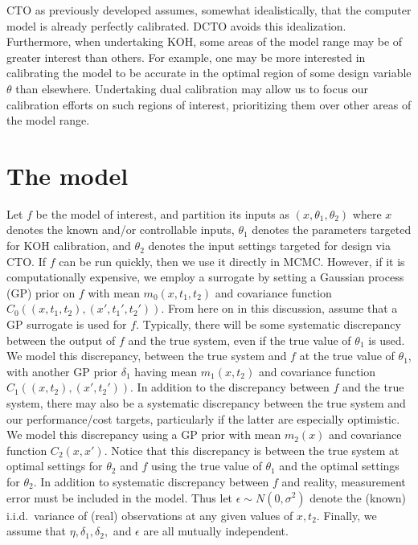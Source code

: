 \documentclass[12pt]{article}
\begin{document}
CTO as previously developed assumes, somewhat idealistically, that the computer model is already perfectly calibrated.
%
DCTO avoids this idealization.
%
Furthermore, when undertaking KOH, some areas of the model range may be of greater interest than others.
%
For example, one may be more interested in calibrating the model to be accurate in the optimal region of some design variable $\theta$ than elsewhere.
%
Undertaking dual calibration may allow us to focus our calibration efforts on such regions of interest, prioritizing them over other areas of the model range.
%

\section{The model}

%
Let $f$ be the model of interest, and partition its inputs as $(x,\theta_1,\theta_2)$ where $x$ denotes the known and/or controllable inputs, $\theta_1$ denotes the parameters targeted for KOH calibration, and $\theta_2$ denotes the input settings targeted for design via CTO.
%
If $f$ can be run quickly, then we use it directly in MCMC.
%
However, if it is computationally expensive, we employ a surrogate by setting a Gaussian process (GP) prior on $f$ with mean $m_0(x,t_1,t_2)$ and covariance function $C_0((x,t_1,t_2),(x',t_1',t_2'))$.
%
From here on in this discussion, assume that a GP surrogate is used for $f$.
%
Typically, there will be some systematic discrepancy between the output of $f$ and the true system, even if the true value of $\theta_1$ is used.
%
We model this discrepancy, between the true system and $f$ at the true value of $\theta_1$, with another GP prior $\delta_1$ having mean $m_1(x,t_2)$ and covariance function $C_1((x,t_2),(x',t_2'))$.
%
In addition to the discrepancy between $f$ and the true system, there may also be a systematic discrepancy between the true system and our performance/cost targets, particularly if the latter are especially optimistic.
%
We model this discrepancy using a GP prior with mean $m_2(x)$ and covariance function $C_2(x,x')$.
%
Notice that this discrepancy is between the true system at optimal settings for $\theta_2$ and $f$ using the true value of $\theta_1$ and the optimal settings for $\theta_2$.
%
In addition to systematic discrepancy between $f$ and reality, measurement error must be included in the model.
%
Thus let $\epsilon\sim N(0,\sigma^2)$ denote the (known) i.i.d.\ variance of (real) observations at any given values of $x,t_2$.
%
Finally, we assume that $\eta,\delta_1,\delta_2,$ and $\epsilon$ are all mutually independent.
%
\end{document}
